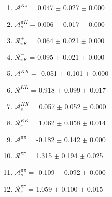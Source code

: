 \begin{enumerate}
\item $\mathcal{A}^{K\pi}$ = 0.047 $\pm$ 0.027 $\pm$ 0.000
\item $\mathcal{A}_s^{\pi K}$ = 0.006 $\pm$ 0.017 $\pm$ 0.000
\item $\mathcal{R}_{\pi K}^+$ = 0.064 $\pm$ 0.021 $\pm$ 0.000
\item $\mathcal{R}_{\pi K}^-$ = 0.095 $\pm$ 0.021 $\pm$ 0.000
\item $\mathcal{A}^{KK}$ = -0.051 $\pm$ 0.101 $\pm$ 0.000
\item $\mathcal{R}^{KK}$ = 0.918 $\pm$ 0.099 $\pm$ 0.017
\item $\mathcal{A}_s^{KK}$ = 0.057 $\pm$ 0.052 $\pm$ 0.000
\item $\mathcal{R}_{s}^{KK}$ = 1.062 $\pm$ 0.058 $\pm$ 0.014
\item $\mathcal{A}^{\pi\pi}$ = -0.182 $\pm$ 0.142 $\pm$ 0.000
\item $\mathcal{R}^{\pi\pi}$ = 1.315 $\pm$ 0.194 $\pm$ 0.025
\item $\mathcal{A}_s^{\pi\pi}$ = -0.109 $\pm$ 0.092 $\pm$ 0.000
\item $\mathcal{R}_{s}^{\pi\pi}$ = 1.059 $\pm$ 0.100 $\pm$ 0.015
\end{enumerate}
